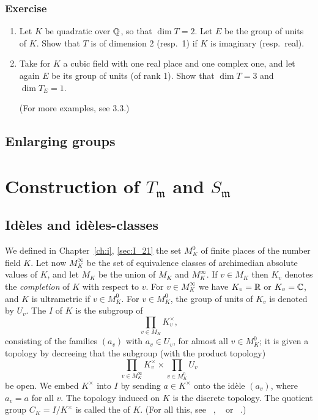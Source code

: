 \subsubsection*{Exercise}
\begin{enumerate}[label=\textit{\alph*}.]
\item Let $K$ be quadratic over $\mathbb{Q}$, so that $\dim T = 2$. Let $E$ be the
	group of units of $K$. Show that $T$ is of dimension 2 (resp.\ 1) if
	$K$ is imaginary (resp.\ real).
\item Take for $K$ a cubic field with one real place and one complex one, and
	let again $E$ be its group of units (of rank 1). Show that $\dim T = 3$
	and $\dim T_E = 1$.

	(For more examples, see 3.3.)\dpage
\end{enumerate}

\subsection{Enlarging groups}
\label{sec:II_13}

\section{Construction of \texorpdfstring{$T_{\mathfrak{m}}$}{Tm} and
\texorpdfstring{$S_{\mathfrak{m}}$}{Sm}}

\subsection{Idèles and idèles-classes}
We defined in Chapter~\ref{ch:i}, \ref{sec:I_21} the set $M_K^0$ of finite
places of the number field $K$. Let now $M_K^\infty$
be the set of equivalence classes of archimedian absolute values of $K$, and
let $M_K$ be the union of $M_K$ and $M_K^\infty$. If $v \in
M_K$ then $K_v$ denotes the \emph{completion} of $K$ with respect to $v$. For
$v \in M_K^\infty$ we have $K_v = \mathbb{R}$ or $K_v = \mathbb{C}$, and $K$ is ultrametric if
$v \in M_K^0$. For $v \in M_K^0$, the group of units of $K_v$ is denoted by
$U_v$. The  $I$
of $K$ is the subgroup of
\[
	\prod_{v \in M_K} K_v^\times,
\]
consisting of the families $(a_v)$ with $a_v \in U_v$, for almost all $v \in
M_K^0$; it is given a topology by decreeing that the subgroup (with the product
topology)
\[
	\prod_{v \in M_K^\infty} K_v^\times \times \prod_{v \in M_K^0} U_v
\]
be open. We embed $K^\times$ into $I$ by sending $a \in K^\times$ onto the
idèle $(a_v)$, where $a_v = a$ for all $v$. The topology induced on $K$ is the
discrete topology. The quotient group $C_K = I/K^\times$ is called the  of
$K$.
(For all this, see \citeauthor{6}~\cite{6}, \citeauthor{13}~\cite{13} or
\citeauthor{44}~\cite{44}.)

